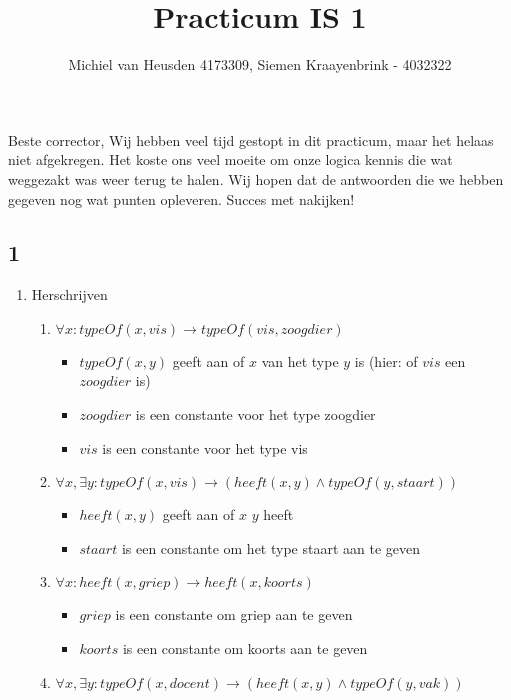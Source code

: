 \documentclass[]{article}
\title{Practicum IS 1}
\author{Michiel van Heusden 4173309, Siemen Kraayenbrink - 4032322}
\date{}
\begin{document}
  \maketitle
  Beste corrector,
  \newline Wij hebben veel tijd gestopt in dit practicum, maar het helaas niet afgekregen. Het koste ons veel moeite om onze logica kennis
  die wat weggezakt was weer terug te halen. Wij hopen dat de antwoorden die we hebben gegeven nog wat punten opleveren. Succes met nakijken!
  \subsection*{1}
  \begin{enumerate}[a]
    \item Herschrijven
    \begin{enumerate}[i]
      \item $ \forall x : typeOf(x,vis) \longrightarrow typeOf(vis, zoogdier) $
      \begin{itemize}
        \item $typeOf(x,y) $ geeft aan of $x$ van het type $y$ is (hier: of $vis$ een $zoogdier$ is)
        \item $zoogdier$ is een constante voor het type zoogdier
        \item $vis$ is een constante voor het type vis
      \end{itemize}
      \item $ \forall x, \exists y : typeOf(x,vis) \longrightarrow (heeft(x, y) \land typeOf(y,staart)) $
      \begin{itemize}
        \item $heeft(x,y) $ geeft aan of $x$ $y$ heeft
        \item $staart$ is een constante om het type staart aan te geven
      \end{itemize}
      \item $\forall x : heeft(x,griep) \longrightarrow heeft(x,koorts) $
      \begin{itemize}
        \item $griep$ is een constante om griep aan te geven
        \item $koorts$ is een constante om koorts aan te geven
      \end{itemize}
      \item $ \forall x, \exists y : typeOf(x,docent) \longrightarrow (heeft(x, y) \land typeOf(y,vak)) $
      \begin{itemize}

\end{itemize}
\end{enumerate}
\end{enumerate}
\end{document}
